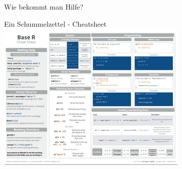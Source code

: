 \documentclass[ignorenonframetext,]{beamer}
\begin{document}
\begin{frame}[fragile]{Wie bekommt man Hilfe?}
\begin{block}{Ein Schummelzettel - Cheatsheet}
\includegraphics{./tex2pdf.9796/7d1907fc7cfa03bf0f3e2ee3123fcb07ca60f41c.png}

\end{block}

\end{frame}
\end{document}
